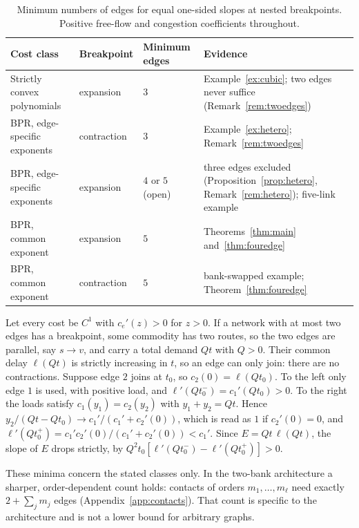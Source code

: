 \begin{table}[htbp]
\centering\small
\begin{tabularx}{\linewidth}{@{}>{\raggedright\arraybackslash}p{4.3cm}>{\raggedright\arraybackslash}p{2.3cm}>{\raggedright\arraybackslash}p{2.6cm}X@{}}
\toprule
Cost class & Breakpoint & Minimum edges & Evidence\\
\midrule
Strictly convex polynomials & expansion & $3$ & Example~\ref{ex:cubic}; two edges never suffice (Remark~\ref{rem:twoedges})\\
BPR, edge-specific exponents & contraction & $3$ & Example~\ref{ex:hetero}; Remark~\ref{rem:twoedges}\\
BPR, edge-specific exponents & expansion & $4$ or $5$ (open) & three edges excluded (Proposition~\ref{prop:hetero}, Remark~\ref{rem:hetero}); five-link example\\
BPR, common exponent & expansion & $5$ & Theorems~\ref{thm:main} and~\ref{thm:fouredge}\\
BPR, common exponent & contraction & $5$ & bank-swapped example; Theorem~\ref{thm:fouredge}\\
\bottomrule
\end{tabularx}
\caption{Minimum numbers of edges for equal one-sided slopes at nested breakpoints. Positive free-flow and congestion coefficients throughout.}
\label{tab:minimaledges}
\end{table}

\begin{remark}\label{rem:twoedges}
Let every cost be $C^1$ with $c_e'(z)>0$ for $z>0$. If a network with at most two edges has a breakpoint, some commodity has two routes, so the two edges are parallel, say $s\to v$, and carry a total demand $Qt$ with $Q>0$. Their common delay $\ell(Qt)$ is strictly increasing in $t$, so an edge can only join: there are no contractions. Suppose edge $2$ joins at $t_0$, so $c_2(0)=\ell(Qt_0)$. To the left only edge $1$ is used, with positive load, and $\ell'(Qt_0^-)=c_1'(Qt_0)>0$. To the right the loads satisfy $c_1(y_1)=c_2(y_2)$ with $y_1+y_2=Qt$. Hence $y_2/(Qt-Qt_0)\to c_1'/(c_1'+c_2'(0))$, which is read as $1$ if $c_2'(0)=0$, and $\ell'(Qt_0^+)=c_1'c_2'(0)/(c_1'+c_2'(0))<c_1'$. Since $E=Qt\,\ell(Qt)$, the slope of $E$ drops strictly, by $Q^2t_0[\ell'(Qt_0^-)-\ell'(Qt_0^+)]>0$.
\end{remark}

These minima concern the stated classes only. In the two-bank architecture a sharper, order-dependent count holds: contacts of orders $m_1,\dots,m_\ell$ need exactly $2+\sum_jm_j$ edges (Appendix~\ref{app:contacts}). That count is specific to the architecture and is not a lower bound for arbitrary graphs.
